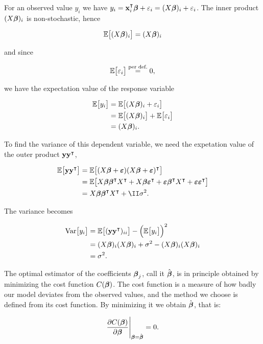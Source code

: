 For an observed value $y_i$ we have $y_i = \mathbf{x}_i^\intercal \boldsymbol{\beta} + \varepsilon_i = (X\boldsymbol{\beta})_{i}+ \varepsilon_i$. The inner product $(X\boldsymbol{\beta})_{i}$ is non-stochastic, hence 

\begin{align*}
    \mathbb{E}\big[(X\boldsymbol{\beta})_{i}\big] = (X\boldsymbol{\beta})_{i}
\end{align*}

and since 

\begin{align*}
    \mathbb{E}\big[\varepsilon_i\big] \stackrel{\text{per def.}}{=} 0,
\end{align*}

we have the expectation value of the response variable

\begin{align*}
    \mathbb{E}\big[y_i\big] &= \mathbb{E}\big[(X\boldsymbol{\beta})_{i}+ \varepsilon_i\big] \\
    &= \mathbb{E}\big[(X\boldsymbol{\beta})_{i}\big] + \mathbb{E}\big[\varepsilon_i\big] \\
    &= (X\boldsymbol{\beta})_{i}.
\end{align*}

To find the variance of this dependent variable, we need the expetation value of the outer product $\mathbf{y}\mathbf{y}^\intercal$,

\begin{align}
    \EE{\vec{y} \vec{y}\TT} &= \EE{(X\svec{\beta} + \svec{\epsilon})(X\svec{\beta} + \svec{\epsilon})\TT} \nonumber\\
    &= \EE{\Xb \svec{\beta}\TT X\TT + \Xb \svec{\epsilon}\TT + \svec{\epsilon}\svec{\beta}\TT X\TT + \svec{\epsilon} \svec{\epsilon}\TT} \nonumber \\
    &= \Xb \svec{\beta}\TT X\TT + \II \sigma^2. \label{eq:expectation_yyT}
\end{align}

The variance becomes

\begin{align*}
    \text{Var}\big[y_i\big] &= \mathbb{E}\big[(\mathbf{y}\mathbf{y}^\intercal)_{ii}\big] -\Big(\mathbb{E}\big[y_i\big]\Big)^2\\
    &= (X\boldsymbol{\beta})_{i} (X\boldsymbol{\beta})_{i} + \sigma^2 - (X\boldsymbol{\beta})_{i} (X\boldsymbol{\beta})_{i}\\
    &= \sigma^2.
\end{align*}


The optimal estimator of the coefficients $\boldsymbol{\beta}_j$, call it $\hat{\boldsymbol{\beta}}$, is in principle obtained by minimizing the cost function $C(\boldsymbol{\beta})$. The cost function is a measure of how badly our model deviates from the observed values, and the method we choose is defined from its cost function. By minimizing it we obtain $\hat{\boldsymbol{\beta}}$, that is:

\begin{align}\label{eq:general_LS}
    \pdv{C(\boldsymbol{\beta})}{\boldsymbol{\beta}}\Bigg|_{\boldsymbol{\beta}=\hat{\boldsymbol{\beta}}} = 0.
\end{align}



